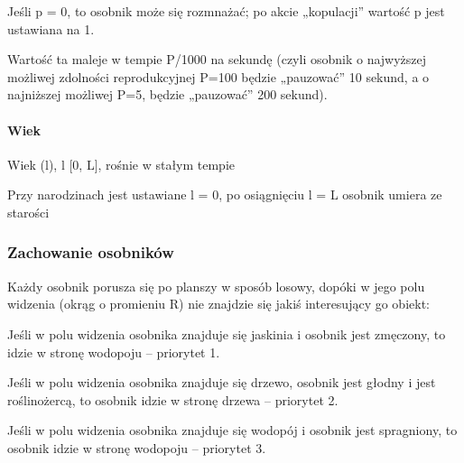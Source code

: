 \begin{DoxyItemize}
\item Jeśli p = 0, to osobnik może się rozmnażać; po akcie „kopulacji” wartość p jest ustawiana na 1.
\end{DoxyItemize}


\begin{DoxyItemize}
\item Wartość ta maleje w tempie P/1000 na sekundę (czyli osobnik o najwyższej możliwej zdolności reprodukcyjnej P=100 będzie „pauzować” 10 sekund, a o najniższej możliwej P=5, będzie „pauzować” 200 sekund).
\end{DoxyItemize}

\paragraph*{Wiek}

Wiek (l), l  \mbox{[}0, L\mbox{]}, rośnie w stałym tempie


\begin{DoxyItemize}
\item Przy narodzinach jest ustawiane l = 0, po osiągnięciu l = L osobnik umiera ze starości
\end{DoxyItemize}

\subsubsection*{Zachowanie osobników}

Każdy osobnik porusza się po planszy w sposób losowy, dopóki w jego polu widzenia (okrąg o promieniu R) nie znajdzie się jakiś interesujący go obiekt\-:


\begin{DoxyItemize}
\item Jeśli w polu widzenia osobnika znajduje się jaskinia i osobnik jest zmęczony, to idzie w stronę wodopoju – priorytet 1.
\end{DoxyItemize}


\begin{DoxyItemize}
\item Jeśli w polu widzenia osobnika znajduje się drzewo, osobnik jest głodny i jest roślinożercą, to osobnik idzie w stronę drzewa – priorytet 2.
\end{DoxyItemize}


\begin{DoxyItemize}
\item Jeśli w polu widzenia osobnika znajduje się wodopój i osobnik jest spragniony, to osobnik idzie w stronę wodopoju – priorytet 3.
\end{DoxyItemize}


